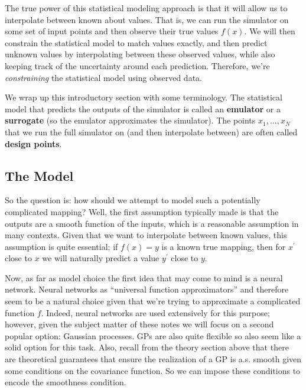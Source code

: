 \documentclass[12pt]{article}
\begin{document}
The true power of this statistical modeling approach is that it will allow us to interpolate between known about values. That is, we can run the simulator on some set of 
input points and then observe their true values $f(x)$. We will then constrain the statistical model to match values exactly, and then predict unknown values by interpolating 
between these observed values, while also keeping track of the uncertainty around each prediction. Therefore, we're \textit{constraining} the statistical model using observed
data. 

We wrap up this introductory section with some terminology. The statistical model that predicts the outputs of the simulator is called an \textbf{emulator} or a \textbf{surrogate}
(so the emulator approximates the simulator). The points $x_1, \dots, x_N$ that we run the full simulator on (and then interpolate between) are often called \textbf{design points}. 

\subsection{The Model}
So the question is: how should we attempt to model such a potentially complicated mapping? Well, the first assumption typically made is that the outputs are a smooth function
of the inputs, which is a reasonable assumption in many contexts. Given that we want to interpolate between known values, this assumption is quite essential; if $f(x) = y$ is a known 
true mapping, then for $x^\prime$ close to $x$ we will naturally predict a value $y^\prime$ close to $y$. 

Now, as far as model choice the first idea that may come to mind is a neural network. Neural networks as ``universal function approximators'' and therefore seem to be a natural choice
given that we're trying to approximate a complicated function $f$. Indeed, neural networks are used extensively for this purpose; however, given the subject matter of these notes we will 
focus on a second popular option: Gaussian processes. GPs are also quite flexible so also seem like a solid option for this task. Also, recall from the theory section above that there are 
theoretical guarantees that ensure the realization of a GP is a.s. smooth given some conditions on the covariance function. So we can impose these conditions to encode the smoothness 
condition. 
\end{document}
